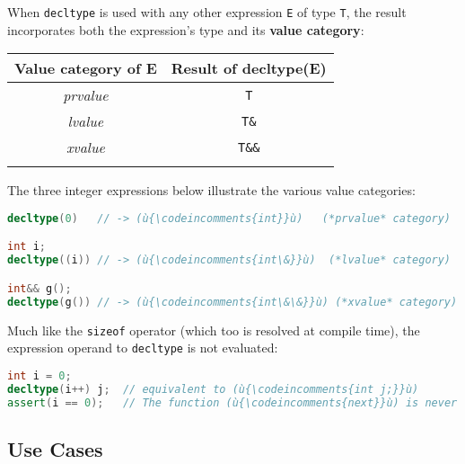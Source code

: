 When \texttt{decltype} is used with any other expression \texttt{E} of
type \texttt{T}, the result incorporates both the expression's type and
its \textbf{value category}:
\begin{center}
{\small \begin{tabular}{c|c}\thickhline 
\rowcolor[gray]{.9}   {\sffamily\bfseries Value category of {\ttfamily\bfseries E}} 
& {\sffamily\bfseries Result of {\ttfamily\bfseries decltype(E)}} \\ \hline 
{\it prvalue} &\texttt{T} \\ \hline
{\it lvalue} & \texttt{T\&} \\ \hline 
{\it xvalue} & \texttt{T\&\&} \\ \thickhline
\end{tabular}
}
\end{center}
\noindent The three integer expressions below illustrate the various value
categories:

\begin{lstlisting}[language=C++]
decltype(0)   // -> (ù{\codeincomments{int}}ù)   (*prvalue* category)

int i;
decltype((i)) // -> (ù{\codeincomments{int\&}}ù)  (*lvalue* category)

int&& g();
decltype(g()) // -> (ù{\codeincomments{int\&\&}}ù) (*xvalue* category)
\end{lstlisting}
    
\noindent Much like the \texttt{sizeof}
operator (which too is resolved at compile time), the expression operand to \texttt{decltype} is not evaluated:

\begin{lstlisting}[language=C++]
int i = 0;
decltype(i++) j;  // equivalent to (ù{\codeincomments{int j;}}ù)
assert(i == 0);   // The function (ù{\codeincomments{next}}ù) is never invoked.
\end{lstlisting}
    

\subsection[Use Cases]{Use Cases}\label{use-cases}

